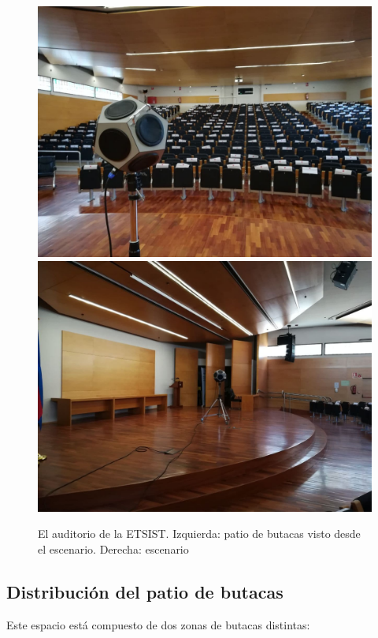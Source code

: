 \documentclass[11pt,a4paper]{book}
\begin{document}
 			\begin{figure}
 				\includegraphics[scale=.25]{../imagenes/fuente.jpg}%
 				\includegraphics[scale=.25]{../imagenes/fuente2.jpg} 
 				\centering
 				\caption{El auditorio de la ETSIST. Izquierda: patio de butacas visto desde el escenario. Derecha: escenario}
 				\label{fig:materiales}

 			\end{figure}
 


		\subsection{Distribución del patio de butacas}
			Este espacio está compuesto de dos zonas de butacas distintas:
\end{document}
